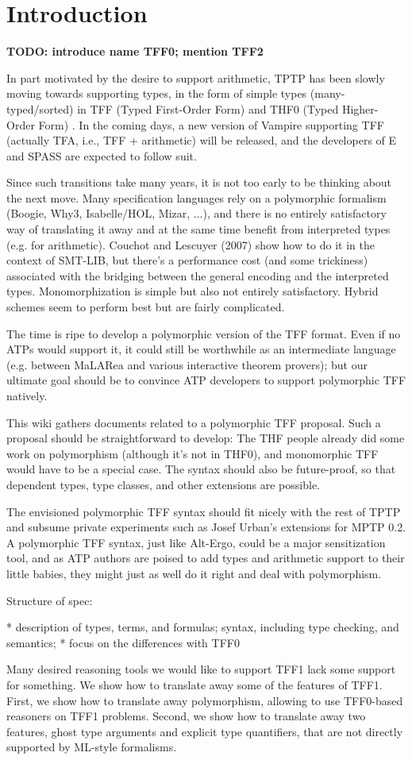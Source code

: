 \section{Introduction}
\label{sec_intro}

\textbf{TODO: introduce name TFF0; mention TFF2}

In part motivated by the desire to support arithmetic, TPTP has been slowly
moving towards supporting types, in the form of simple types (many-typed/sorted)
in TFF (Typed First-Order Form) \cite{TFF0} and THF0 (Typed Higher-Order Form)
\cite{xxx}. In the coming days, a new version of Vampire supporting TFF
(actually TFA, i.e., TFF + arithmetic) will be released, and the developers of E
and SPASS are expected to follow suit.

Since such transitions take many years, it is not too early to be thinking about
the next move. Many specification languages rely on a polymorphic formalism
(Boogie, Why3, Isabelle/HOL, Mizar, ...), and there is no entirely satisfactory
way of translating it away and at the same time benefit from interpreted types
(e.g. for arithmetic). Couchot and Lescuyer (2007) show how to do it in the
context of SMT-LIB, but there's a performance cost (and some trickiness)
associated with the bridging between the general encoding and the interpreted
types. Monomorphization is simple but also not entirely satisfactory. Hybrid
schemes seem to perform best but are fairly complicated.

The time is ripe to develop a polymorphic version of the TFF format. Even if no
ATPs would support it, it could still be worthwhile as an intermediate language
(e.g. between MaLARea and various interactive theorem provers); but our ultimate
goal should be to convince ATP developers to support polymorphic TFF natively.

This wiki gathers documents related to a polymorphic TFF proposal. Such a
proposal should be straightforward to develop: The THF people already did some
work on polymorphism (although it's not in THF0), and monomorphic TFF would have
to be a special case. The syntax should also be future-proof, so that dependent
types, type classes, and other extensions are possible.

The envisioned polymorphic TFF syntax should fit nicely with the rest of TPTP
and subsume private experiments such as Josef Urban's extensions for MPTP 0.2. A
polymorphic TFF syntax, just like Alt-Ergo, could be a major sensitization tool,
and as ATP authors are poised to add types and arithmetic support to their
little babies, they might just as well do it right and deal with polymorphism.

Structure of spec:

  * description of types, terms, and formulas; syntax, including type checking,
    and semantics;
  * focus on the differences with TFF0

Many desired reasoning tools we would like to support TFF1 lack some support for
something. We show how to translate away some of the features of TFF1. First, we
show how to translate away polymorphism, allowing to use TFF0-based reasoners on
TFF1 problems. Second, we show how to translate away two features,
ghost type arguments and explicit type quantifiers, that are not directly
supported by ML-style formalisms.
